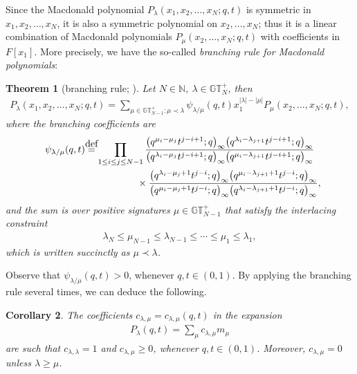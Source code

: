 \documentclass[11pt]{article}
\numberwithin{equation}{section}
\newcommand\myeq{\mathrel{\stackrel{\makebox[0pt]{\mbox{\normalfont\tiny def}}}{=}}}
\newtheorem{thm}{Theorem}[section]
\newtheorem{cor}[thm]{Corollary}
\newcommand{\N}{\mathbb{N}}
\newcommand{\GTp}{\mathbb{GT}^+}
\begin{document}
Since the Macdonald polynomial $P_{\lambda}(x_1, x_2, \dots, x_N; q, t)$ is symmetric in $x_1, x_2, \dots, x_N$, it is also a symmetric polynomial on $x_2, \dots, x_N$; thus it is a linear combination of Macdonald polynomials $P_{\mu}(x_2, \dots, x_N; q, t)$ with coef\/f\/icients in $F[x_1]$. More precisely, we have the so-called \textit{branching rule for Macdonald polynomials}:

\begin{thm}[{branching rule; \cite[Chapter~VI, equation~(7.13$'$), Example~2(b) on p.~342]{M2}}]\label{branchingmacdonald}
Let $N\in\N$, $\lambda\in\GTp_N$, then
\begin{gather*}
P_{\lambda}(x_1, x_2, \dots, x_N; q, t) = \sum_{\mu \in\GTp_{N-1}\colon \mu\prec\lambda}{\psi_{\lambda/\mu}(q, t)x_1^{|\lambda| - |\mu|}P_{\mu}(x_2, \dots, x_N; q, t)},
\end{gather*}
where the branching coefficients are
\begin{gather*}
\psi_{\lambda/\mu}(q, t) \myeq \prod_{1\leq i \leq j\leq N-1}\frac{\big(q^{\mu_i - \mu_j}t^{j-i+1}; q\big)_{\infty}\big(q^{\lambda_i - \lambda_{j+1}}t^{j-i+1}; q\big)_{\infty} }
{\big(q^{\lambda_i - \mu_j}t^{j-i+1}; q\big)_{\infty}\big(q^{\mu_i - \lambda_{j+1}}t^{j-i+1}; q\big)_{\infty} }\\
\hphantom{\psi_{\lambda/\mu}(q, t) \myeq \prod_{1\leq i \leq j\leq N-1}}{} \times \frac{\big(q^{\lambda_i - \mu_j+1}t^{j-i}; q\big)_{\infty}\big(q^{\mu_i - \lambda_{j+1} + 1}t^{j-i}; q\big)_{\infty}}{\big(q^{\mu_i - \mu_j+1}t^{j-i}; q\big)_{\infty}\big(q^{\lambda_i - \lambda_{j+1}+1}t^{j-i}; q\big)_{\infty}} ,
\end{gather*}
and the sum is over positive signatures $\mu\in\GTp_{N-1}$ that satisfy the interlacing constraint
\begin{gather*}
\lambda_N \leq \mu_{N-1} \leq \lambda_{N-1} \leq \cdots \leq \mu_1 \leq \lambda_1,
\end{gather*}
which is written succinctly as $\mu\prec\lambda$.
\end{thm}

Observe that $\psi_{\lambda/\mu}(q, t) > 0$, whenever $q, t \in (0, 1)$. By applying the branching rule several times, we can deduce the following.

\begin{cor}\label{cor:branchingrule}
The coefficients $c_{\lambda, \mu} = c_{\lambda, \mu}(q, t)$ in the expansion
\begin{gather*}
P_{\lambda}(q, t) = \sum_{\mu}{c_{\lambda, \mu}m_{\mu}}
\end{gather*}
are such that $c_{\lambda, \lambda} = 1$ and $c_{\lambda, \mu} \geq 0$, whenever $q, t \in (0, 1)$. Moreover, $c_{\lambda, \mu} = 0$ unless $\lambda \geq \mu$.
\end{cor}
\end{document}
